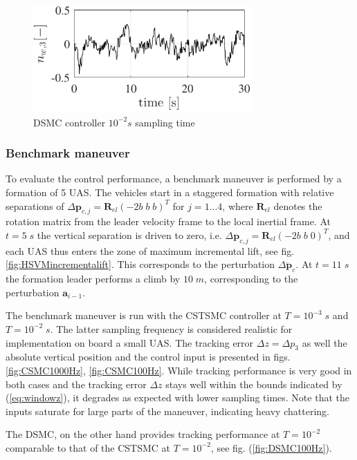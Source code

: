 \documentclass{ifacconf}
\providecommand{\mbf}[1]{\mathbf{#1}}
\newcommand{\idxPredecessor}{{\ensuremath{i-1} }}
\begin{document}
\begin{figure}
\begin{center}
\includegraphics[width=8.4cm]{nwz-timeseries}    %
\caption{ DSMC controller $10^{-2} s$ sampling time}
\label{fig:nwztimeseries}
\end{center}
\end{figure}

\subsubsection{Benchmark maneuver}

To evaluate the control performance, a benchmark maneuver is performed by a formation of 5 UAS. The vehicles start in a staggered formation with relative separations of $\Delta \mbf{p}_{c,j} = \mbf{R}_{el} (-2b \; b \; b)^T$ for $j=1...4$, where $\mbf{R}_{el}$ denotes the rotation matrix from the leader velocity frame to the local inertial frame. At $t=5 \; s$ the vertical separation is driven to zero, i.e. $\Delta \mbf{p}_{c,j} = \mbf{R}_{el}(-2b \; b \; 0)^T$, and each UAS thus enters the zone of maximum incremental lift, see fig. \ref{fig:HSVMincrementalift}. This corresponds to the perturbation $\Delta \ddot{\mbf{p}}_c$. At $t=11 \;s$ the formation leader performs a climb by $10 \; m$, corresponding to the perturbation $\mbf{a}_{\idxPredecessor}$.

The benchmark maneuver is run with the CSTSMC controller at $T=10^{-3} \; s$ and $T=10^{-2} \; s$. The latter sampling frequency is considered realistic for implementation on board a small UAS. The tracking error $\Delta z = \Delta p_3$ as well the absolute vertical position and the control input is presented in figs. \ref{fig:CSMC1000Hz}, \ref{fig:CSMC100Hz}. While tracking performance is very good in both cases and the tracking error $\Delta z$ stays well within the bounds indicated by (\ref{eq:windowz}), it degrades as expected with lower sampling times. Note that the inputs saturate for large parts of the maneuver, indicating heavy chattering. 

The DSMC, on the other hand provides tracking performance at $T = 10^{-2}$ comparable to that of the CSTSMC at $T = 10^{-2}$, see fig. (\ref{fig:DSMC100Hz}).
\end{document}

